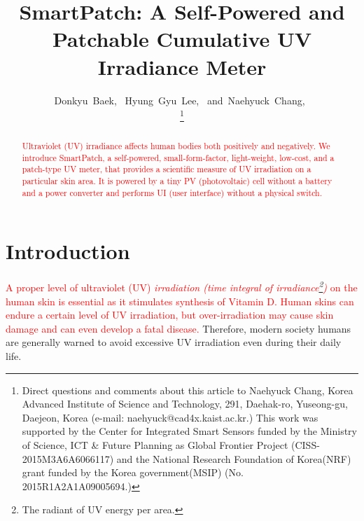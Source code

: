 \documentclass[journal]{IEEEtran}
\begin{document}
\title{SmartPatch: A Self-Powered and Patchable Cumulative UV Irradiance Meter}

\author{
	Donkyu~Baek,~
	Hyung~Gyu~Lee,~
	and~Naehyuck~Chang,~

\thanks{Direct questions and comments about this article to Naehyuck Chang, Korea Advanced Institute of Science and Technology, 291, Daehak-ro, Yuseong-gu, Daejeon, Korea (e-mail: naehyuck@cad4x.kaist.ac.kr.) This work was supported by the Center for Integrated Smart Sensors funded by the Ministry of Science, ICT \& Future Planning as Global Frontier Project (CISS-2015M3A6A6066117) and the National Research Foundation of Korea(NRF) grant funded by the Korea government(MSIP) (No. 2015R1A2A1A09005694.)}
}

\maketitle

\begin{abstract}
\textcolor{red}{Ultraviolet (UV) irradiance affects human bodies both positively and negatively. We introduce SmartPatch, a self-powered, small-form-factor, light-weight, low-cost, and a patch-type UV meter, that provides a scientific measure of UV irradiation on a particular skin area. It is powered by a tiny PV (photovoltaic) cell without a battery and a power converter and performs UI (user interface) without a physical switch.} 
\end{abstract}



\section{Introduction}

\textcolor{red}{A proper level of ultraviolet (UV) \textit{irradiation (time integral of irradiance\footnote{The radiant of UV energy per area.})} on the human skin is essential as it stimulates synthesis of Vitamin D. Human skins can endure a certain level of UV irradiation, but over-irradiation may cause skin damage and can even develop a fatal disease.}
Therefore, modern society humans are generally warned to avoid excessive UV irradiation even during their daily life.
\end{document}

